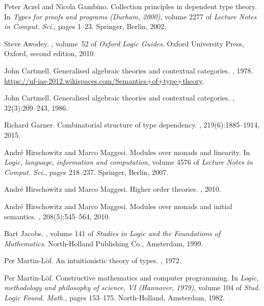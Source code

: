 \documentclass[11pt]{article}
\begin{document}
\def\cprime{$'$}
\begin{thebibliography}{10}

Peter Aczel and Nicola Gambino.
\newblock Collection principles in dependent type theory.
\newblock In {\em Types for proofs and programs ({D}urham, 2000)}, volume 2277
  of {\em Lecture Notes in Comput. Sci.}, pages 1--23. Springer, Berlin, 2002.

Steve Awodey.
, volume~52 of {\em Oxford Logic Guides}.
\newblock Oxford University Press, Oxford, second edition, 2010.

John Cartmell.
\newblock Generalised algebraic theories and contextual categories.
, 1978.
\newblock \url{https://uf-ias-2012.wikispaces.com/Semantics+of+type+theory}.

John Cartmell.
\newblock Generalised algebraic theories and contextual categories.
, 32(3):209--243, 1986.

Richard Garner.
\newblock Combinatorial structure of type dependency.
, 219(6):1885--1914, 2015.

Andr{\'e} Hirschowitz and Marco Maggesi.
\newblock Modules over monads and linearity.
\newblock In {\em Logic, language, information and computation}, volume 4576 of
  {\em Lecture Notes in Comput. Sci.}, pages 218--237. Springer, Berlin, 2007.

Andr{\'e} Hirschowitz and Marco Maggesi.
\newblock Higher order theories.
, 2010.

Andr{\'e} Hirschowitz and Marco Maggesi.
\newblock Modules over monads and initial semantics.
, 208(5):545--564, 2010.

Bart Jacobs.
, volume 141 of {\em Studies
  in Logic and the Foundations of Mathematics}.
\newblock North-Holland Publishing Co., Amsterdam, 1999.

Per Martin-L{\"o}f.
\newblock An intuitionistic theory of types.
,
  1972.

Per Martin-L{\"o}f.
\newblock Constructive mathematics and computer programming.
\newblock In {\em Logic, methodology and philosophy of science, {VI}
  ({H}annover, 1979)}, volume 104 of {\em Stud. Logic Found. Math.}, pages
  153--175. North-Holland, Amsterdam, 1982.


\end{thebibliography}
\end{document}
